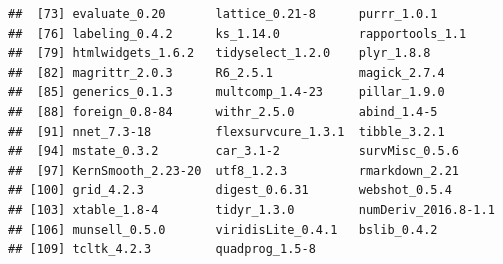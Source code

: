 \documentclass[
]{article}
\begin{document}
\begin{verbatim}
##  [73] evaluate_0.20       lattice_0.21-8      purrr_1.0.1        
##  [76] labeling_0.4.2      ks_1.14.0           rapportools_1.1    
##  [79] htmlwidgets_1.6.2   tidyselect_1.2.0    plyr_1.8.8         
##  [82] magrittr_2.0.3      R6_2.5.1            magick_2.7.4       
##  [85] generics_0.1.3      multcomp_1.4-23     pillar_1.9.0       
##  [88] foreign_0.8-84      withr_2.5.0         abind_1.4-5        
##  [91] nnet_7.3-18         flexsurvcure_1.3.1  tibble_3.2.1       
##  [94] mstate_0.3.2        car_3.1-2           survMisc_0.5.6     
##  [97] KernSmooth_2.23-20  utf8_1.2.3          rmarkdown_2.21     
## [100] grid_4.2.3          digest_0.6.31       webshot_0.5.4      
## [103] xtable_1.8-4        tidyr_1.3.0         numDeriv_2016.8-1.1
## [106] munsell_0.5.0       viridisLite_0.4.1   bslib_0.4.2        
## [109] tcltk_4.2.3         quadprog_1.5-8
\end{verbatim}
\end{document}
